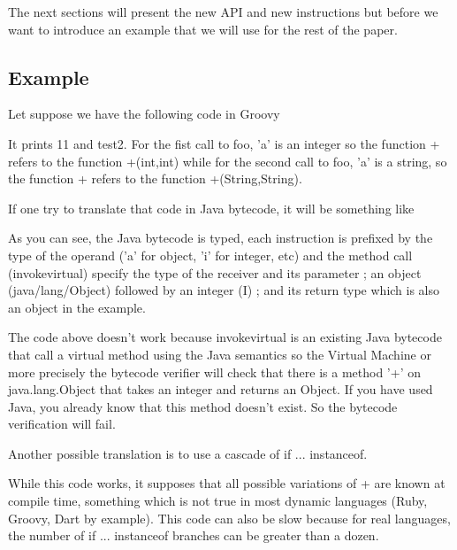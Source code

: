 \documentclass{sigplanconf}
\begin{document}
    The next sections will present the new API and new instructions but before
    we want to introduce an example that we will use for the rest of the paper.

    \subsection{Example}
      Let suppose we have the following code in Groovy \cite{lang-groovy}

      

      It prints 11 and test2. For the fist call to foo, 'a' is an integer so the function + refers
      to the function +(int,int) while for the second call to foo, 'a' is a string, so the
      function + refers to the function +(String,String).

      If one try to translate that code in Java bytecode, it will be something like

      

      As you can see, the Java bytecode is typed, each instruction is prefixed 
      by the type of the operand ('a' for object, 'i' for integer, etc)
      and the method call (invokevirtual) specify the type of the receiver and its parameter ;
      an object (java/lang/Object) followed by an integer (I) ; and its return type
      which is also an object in the example.

      The code above doesn't work because invokevirtual is an existing Java bytecode that call
      a virtual method using the Java semantics so the Virtual Machine or more precisely
      the bytecode verifier will check that there is a method '+' on java.lang.Object
      that takes an integer and returns an Object. If you have used Java, you already know
      that this method doesn't exist. So the bytecode verification will fail.

      Another possible translation is to use a cascade of if ... instanceof.

      

      While this code works, it supposes that all possible variations of + are known at compile time,
      something which is not true in most dynamic languages (Ruby, Groovy, Dart by example).
      This code can also be slow because for real languages, the number of if ... instanceof branches
      can be greater than a dozen. 
      
\end{document}

